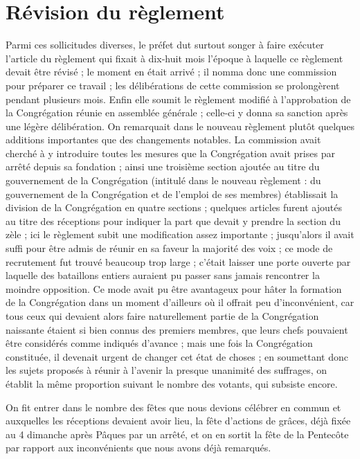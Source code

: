 \section*{Révision du règlement}
Parmi ces sollicitudes diverses, le préfet dut surtout songer à faire exécuter l'article du règlement qui fixait à dix-huit mois l'époque à laquelle ce règlement devait être révisé ; le moment en était arrivé ; il nomma donc une commission pour préparer ce travail ; les délibérations de cette commission se prolongèrent pendant plusieurs mois. Enfin elle soumit le règlement modifié à l'approbation de la Congrégation réunie en assemblée générale ; celle-ci y donna sa sanction après une légère délibération. On remarquait dans le nouveau règlement plutôt quelques additions importantes que des changements notables. La commission avait cherché à y introduire toutes les mesures que la Congrégation avait prises par arrêté depuis sa fondation ; ainsi une troisième section ajoutée au titre du gouvernement de la Congrégation (intitulé dans le nouveau règlement : du gouvernement de la Congrégation et de l'emploi de ses membres) établissait la division de la Congrégation en quatre sections ; quelques articles furent ajoutés au titre des réceptions pour indiquer la part que devait y prendre la section du zèle ; ici le règlement subit une modification assez importante ; jusqu'alors il avait suffi pour être admis de réunir en sa faveur la majorité des voix ; ce mode de recrutement fut trouvé beaucoup trop large ; c'était laisser une porte ouverte par laquelle des bataillons entiers auraient pu passer sans jamais rencontrer la moindre opposition.
Ce mode avait pu être avantageux pour hâter la formation de la Congrégation dans un moment d'ailleurs où il offrait peu d'inconvénient, car tous ceux qui devaient alors faire naturellement partie de la Congrégation naissante étaient si bien connus des premiers membres, que leurs chefs pouvaient être considérés comme indiqués d'avance ; mais une fois la Congrégation constituée, il devenait urgent de changer cet état de choses ; en soumettant donc les sujets proposés à réunir à l'avenir la presque unanimité des suffrages, on établit la même proportion suivant le nombre des votants, qui subsiste encore.

On fit entrer dans le nombre des fêtes que nous devions célébrer en commun et auxquelles les réceptions devaient avoir lieu, la fête d'actions de grâces, déjà fixée au 4 dimanche après Pâques par un arrêté, et on en sortit la fête de la Pentecôte par rapport aux inconvénients que nous avons déjà remarqués.

